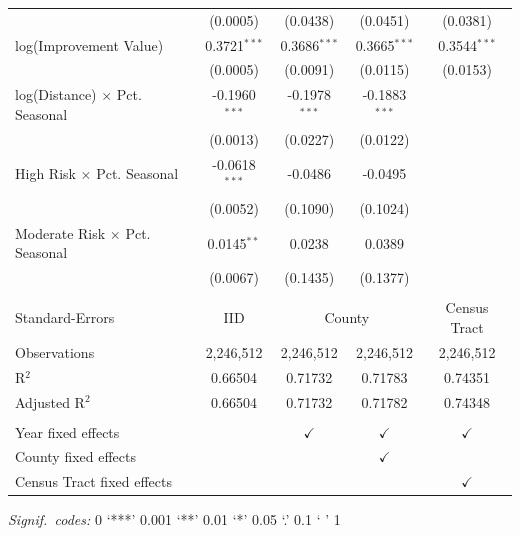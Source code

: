 \documentclass{article}
\begin{document}
\begin{threeparttable}
\begin{tabular}{lcccc}
                                            & (0.0005)                & (0.0438)        & (0.0451)         & (0.0381)\\   
      log(Improvement Value)                & 0.3721$^{***}$          & 0.3686$^{***}$  & 0.3665$^{***}$   & 0.3544$^{***}$\\   
                                            & (0.0005)                & (0.0091)        & (0.0115)         & (0.0153)\\   
      log(Distance) $\times$ Pct. Seasonal  & -0.1960$^{***}$         & -0.1978$^{***}$ & -0.1883$^{***}$  &   \\   
                                            & (0.0013)                & (0.0227)        & (0.0122)         &   \\   
      High Risk $\times$ Pct. Seasonal      & -0.0618$^{***}$         & -0.0486         & -0.0495          &   \\   
                                            & (0.0052)                & (0.1090)        & (0.1024)         &   \\   
      Moderate Risk $\times$ Pct. Seasonal  & 0.0145$^{**}$           & 0.0238          & 0.0389           &   \\   
                                            & (0.0067)                & (0.1435)        & (0.1377)         &   \\   
       \\
      Standard-Errors & IID & \multicolumn{2}{c}{County} & Census Tract \\ 
      Observations                          & 2,246,512               & 2,246,512       & 2,246,512        & 2,246,512\\  
      R$^2$                                 & 0.66504                 & 0.71732         & 0.71783          & 0.74351\\  
      Adjusted R$^2$                        & 0.66504                 & 0.71732         & 0.71782          & 0.74348\\  
       \\
      Year fixed effects                    &                         & $\checkmark$    & $\checkmark$     & $\checkmark$\\   
      County fixed effects                  &                         &                 & $\checkmark$     & \\  
      Census Tract fixed effects            &                         &                 &                  & $\checkmark$\\   
      \bottomrule
   \end{tabular}
\begin{tablenotes}[flushleft]
\footnotesize
\item \textit{Signif.\ codes:} 0 `***' 0.001 `**' 0.01 `*' 0.05 `.' 0.1 ` ' 1
\end{tablenotes}
\end{threeparttable}
\end{document}
